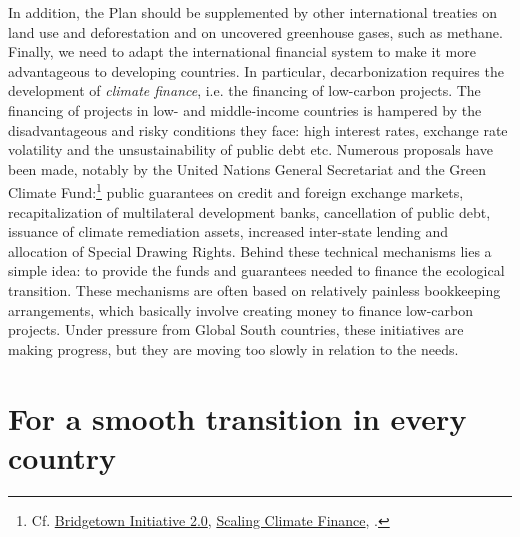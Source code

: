 \documentclass[a5paper,english,openany]{memoir}
\begin{document}
In addition, the Plan should be supplemented by other international treaties on land use and deforestation and on uncovered greenhouse gases, such as methane. %
Finally, we need to adapt the international financial system to make it more advantageous to %
developing countries. In particular, decarbonization %
requires the development of \textit{climate finance}, i.e. the financing of low-carbon projects. The financing of projects in low- and middle-income countries is hampered by the disadvantageous and risky conditions they face: high interest rates, exchange rate volatility and the  unsustainability %
of public debt etc.  %
Numerous proposals have been made, notably by the United Nations General Secretariat and the Green Climate Fund:\footnote{Cf. \href{https://www.un.org/sustainabledevelopment/blog/2023/04/press-release-with-clock-ticking-for-the-sdgs-un-chief-and-barbados-prime-minister-call-for-urgent-action-to-transform-broken-global-financial-system/}{Bridgetown Initiative 2.0}, \href{https://www.greenclimate.fund/sites/default/files/document/scaling-climate-finance-context-covid-19-full-report\_0.pdf}{Scaling Climate Finance}, \citet{hourcade_accelerating_2021}.} public guarantees on credit and foreign exchange markets, recapitalization of multilateral development banks, cancellation of public debt, issuance of climate remediation assets, increased inter-state lending and allocation of Special Drawing Rights. Behind these technical mechanisms lies a simple idea: to provide the funds and guarantees needed to finance the ecological transition. %
These mechanisms are often based on relatively painless bookkeeping arrangements, which basically involve creating money to finance low-carbon projects. Under pressure from Global South countries, these initiatives are making progress, but %
they are moving too slowly in relation to the needs.


\section*{For a smooth transition %
in every country}\label{sec:mue_nationale}
\end{document}
